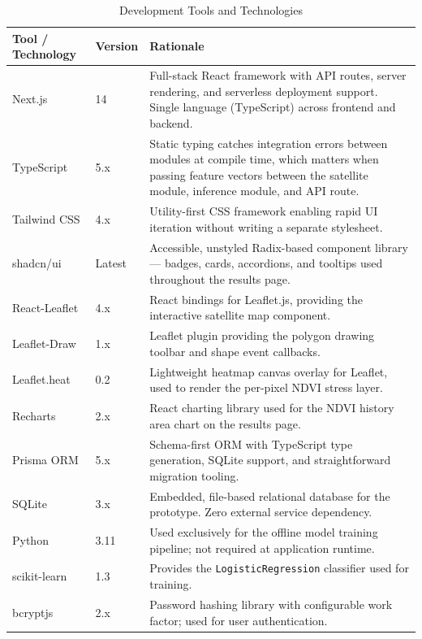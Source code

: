 \begin{table}[H]
  \centering
  \caption{Development Tools and Technologies}
  \label{tab:devtools}
  \begin{tabularx}{\textwidth}{p{3.5cm} p{1.8cm} X}
    \toprule
    \textbf{Tool / Technology} & \textbf{Version} & \textbf{Rationale} \\
    \midrule
    Next.js              & 14         & Full-stack React framework with API routes, server rendering, and serverless deployment support. Single language (TypeScript) across frontend and backend. \\[4pt]
    TypeScript           & 5.x        & Static typing catches integration errors between modules at compile time, which matters when passing feature vectors between the satellite module, inference module, and API route. \\[4pt]
    Tailwind CSS         & 4.x        & Utility-first CSS framework enabling rapid UI iteration without writing a separate stylesheet. \\[4pt]
    shadcn/ui            & Latest     & Accessible, unstyled Radix-based component library — badges, cards, accordions, and tooltips used throughout the results page. \\[4pt]
    React-Leaflet        & 4.x        & React bindings for Leaflet.js, providing the interactive satellite map component. \\[4pt]
    Leaflet-Draw         & 1.x        & Leaflet plugin providing the polygon drawing toolbar and shape event callbacks. \\[4pt]
    Leaflet.heat         & 0.2        & Lightweight heatmap canvas overlay for Leaflet, used to render the per-pixel NDVI stress layer. \\[4pt]
    Recharts             & 2.x        & React charting library used for the NDVI history area chart on the results page. \\[4pt]
    Prisma ORM           & 5.x        & Schema-first ORM with TypeScript type generation, SQLite support, and straightforward migration tooling. \citep{prisma2023} \\[4pt]
    SQLite               & 3.x        & Embedded, file-based relational database for the prototype. Zero external service dependency. \\[4pt]
    Python               & 3.11       & Used exclusively for the offline model training pipeline; not required at application runtime. \\[4pt]
    scikit-learn         & 1.3        & Provides the \texttt{LogisticRegression} classifier used for training. \citep{pedregosa2011} \\[4pt]
    bcryptjs             & 2.x        & Password hashing library with configurable work factor; used for user authentication. \\[4pt]
    \bottomrule
  \end{tabularx}
\end{table}

